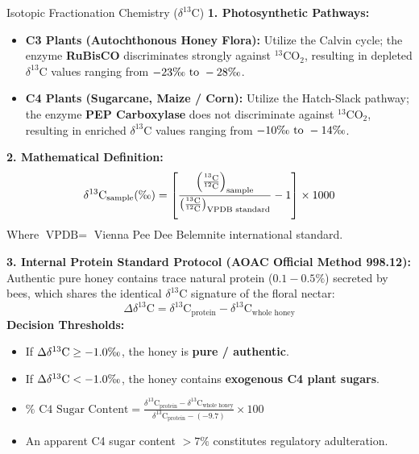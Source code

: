 \documentclass[11pt,a4paper,oneside]{article}
\newcommand{\permil}{\text{\textperthousand}}
\begin{document}
\begin{formulabox}{Isotopic Fractionation Chemistry ($\delta^{13}\text{C}$)}
\textbf{1. Photosynthetic Pathways:}
\begin{itemize}
    \item \textbf{C3 Plants (Autochthonous Honey Flora):} Utilize the Calvin cycle; the enzyme \textbf{RuBisCO} discriminates strongly against ${}^{13}\mathrm{CO_2}$, resulting in depleted $\delta^{13}\text{C}$ values ranging from \textbf{$-23\permil\text{ to }-28\permil$}.
    \item \textbf{C4 Plants (Sugarcane, Maize / Corn):} Utilize the Hatch-Slack pathway; the enzyme \textbf{PEP Carboxylase} does not discriminate against ${}^{13}\mathrm{CO_2}$, resulting in enriched $\delta^{13}\text{C}$ values ranging from \textbf{$-10\permil\text{ to }-14\permil$}.
\end{itemize}
\textbf{2. Mathematical Definition:}
$$\delta^{13}\text{C}_{\text{sample}} (\permil) = \left[ \frac{\left(\frac{{}^{13}\text{C}}{{}^{12}\text{C}}\right)_{\text{sample}}}{\left(\frac{{}^{13}\text{C}}{{}^{12}\text{C}}\right)_{\text{VPDB standard}}} - 1 \right] \times 1000$$
Where $\text{VPDB} =$ Vienna Pee Dee Belemnite international standard.

\textbf{3. Internal Protein Standard Protocol (AOAC Official Method 998.12):}
Authentic pure honey contains trace natural protein ($0.1-0.5\%$) secreted by bees, which shares the identical $\delta^{13}\text{C}$ signature of the floral nectar:
$$\Delta \delta^{13}\text{C} = \delta^{13}\text{C}_{\text{protein}} - \delta^{13}\text{C}_{\text{whole honey}}$$
\textbf{Decision Thresholds:}
\begin{itemize}
    \item If $\Delta \delta^{13}\text{C} \ge -1.0\permil$, the honey is \textbf{pure / authentic}.
    \item If $\Delta \delta^{13}\text{C} < -1.0\permil$, the honey contains \textbf{exogenous C4 plant sugars}.
    \item $\% \text{ C4 Sugar Content} = \frac{\delta^{13}\text{C}_{\text{protein}} - \delta^{13}\text{C}_{\text{whole honey}}}{\delta^{13}\text{C}_{\text{protein}} - (-9.7)} \times 100$
    \item An apparent C4 sugar content \textbf{$>7\%$} constitutes regulatory adulteration.
\end{itemize}
\end{formulabox}
\end{document}
